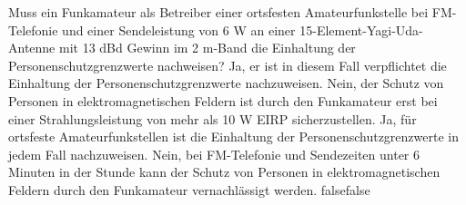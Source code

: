     {Muss ein Funkamateur als Betreiber einer ortsfesten Amateurfunkstelle bei FM-Telefonie und einer Sendeleistung von 6 W an einer 15-Element-Yagi-Uda-Antenne mit 13 dBd Gewinn im 2 m-Band die Einhaltung der Personenschutzgrenzwerte nachweisen?}
    {Ja, er ist in diesem Fall verpflichtet die Einhaltung der Personenschutzgrenzwerte nachzuweisen.}
    {Nein, der Schutz von Personen in elektromagnetischen Feldern ist durch den Funkamateur erst bei einer Strahlungsleistung von mehr als 10 W EIRP sicherzustellen.}
    {Ja, für ortsfeste Amateurfunkstellen ist die Einhaltung der Personenschutzgrenzwerte in jedem Fall nachzuweisen.}
    {Nein, bei FM-Telefonie und Sendezeiten unter 6 Minuten in der Stunde kann der Schutz von Personen in elektromagnetischen Feldern durch den Funkamateur vernachlässigt werden.}
    {false}{false}